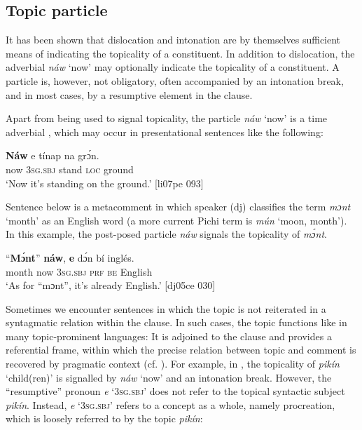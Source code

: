\subsection{Topic particle}\label{sec:7.5.2}

It has been shown that dislocation and intonation are by themselves sufficient means of indicating the topicality of a constituent. In addition to dislocation, the adverbial \textit{náw} ‘now’ may optionally indicate the topicality of a constituent. A particle is, however, not obligatory, often accompanied by an intonation break, and in most cases, by a resumptive element in the clause.


Apart from being used to signal topicality, the particle \textit{náw} ‘now’ is a time adverbial , which may occur in presentational sentences like the following:



\ea%
    \label{ex:key:756}
    \gll \textbf{Náw}    e    tínap  na  grɔ́n.\\
now    \textsc{3sg.sbj}  stand  \textsc{loc}  ground\\

\glt ‘Now it’s standing on the ground.’ [li07pe 093]
\z

Sentence  below is a metacomment in which speaker (dj) classifies the term \textit{mɔnt} ‘month’ as an English word (a more current Pichi term is \textit{mún} ‘moon, month’). In this example, the post-posed particle \textit{náw} signals the topicality of \textit{mɔ́nt}. 


\ea%
    \label{ex:key:757}
    \gll “\textbf{Mɔ́nt}”  \textbf{náw},  \textbf{e}    dɔ́n  bí  inglés.\\
\phantom{“}month  now    \textsc{3sg.sbj}  \textsc{prf}  \textsc{be}  English\\

\glt ‘As for “mɔnt”, it’s already English.’ [dj05ce 030]
\z

Sometimes we encounter sentences in which the topic is not reiterated in a syntagmatic relation within the clause. In such cases, the topic functions like in many topic-prominent languages: It is adjoined to the clause and provides a referential frame, within which the precise relation between topic and comment is recovered by pragmatic context (cf. \citealt{LiThompson1976}). For example, in , the topicality of \textit{pikín} ‘child(ren)’ is signalled by \textit{náw} ‘now’ and an intonation break. However, the “resumptive” pronoun \textit{e} ‘\textsc{3sg.sbj}’ does not refer to the topical syntactic subject \textit{pikín}. Instead, \textit{e} ‘\textsc{3sg.sbj}’ refers to a concept as a whole, namely procreation, which is loosely referred to by the topic \textit{pikín}:


